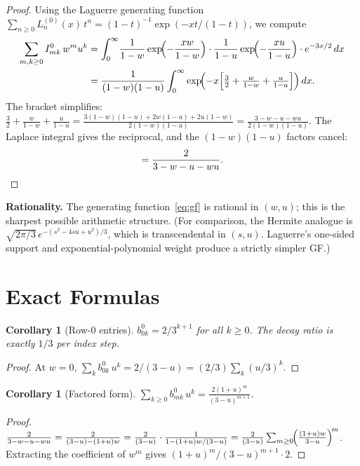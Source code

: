 \documentclass[11pt,a4paper]{article}
\theoremstyle{definition}
\theoremstyle{plain}
\newtheorem{corollary}[definition]{Corollary}
\begin{document}
\begin{proof}
Using the Laguerre generating function
$\sum_{n\ge 0}L_n^{(0)}(x)\,t^n = (1-t)^{-1}\exp(-xt/(1-t))$,
we compute
\begin{align*}
  \sum_{m,k\ge 0} I_{mk}^0\,w^m u^k
  &= \int_0^\infty\!
     \frac{1}{1-w}\exp\!\Bigl(-\frac{xw}{1-w}\Bigr)\cdot
     \frac{1}{1-u}\exp\!\Bigl(-\frac{xu}{1-u}\Bigr)\cdot
     e^{-3x/2}\,dx \\
  &= \frac{1}{(1-w)(1-u)}\int_0^\infty \exp\!\Bigl(
     -x\Bigl[\tfrac{3}{2}+\tfrac{w}{1-w}+\tfrac{u}{1-u}\Bigr]\Bigr)\,dx.
\end{align*}
The bracket simplifies: $\frac{3}{2}+\frac{w}{1-w}+\frac{u}{1-u}
= \frac{3(1-w)(1-u)+2w(1-u)+2u(1-w)}{2(1-w)(1-u)}
= \frac{3-w-u-wu}{2(1-w)(1-u)}$.
The Laplace integral gives the reciprocal, and the $(1-w)(1-u)$ factors cancel:
\[
  = \frac{2}{3-w-u-wu}.\qedhere
\]
\end{proof}

\noindent\textbf{Rationality.} The generating function~\eqref{eq:gf} is
rational in $(w,u)$; this is the sharpest possible arithmetic structure.
(For comparison, the Hermite analogue is $\sqrt{2\pi/3}\,e^{-(s^2-4su+u^2)/3}$,
which is transcendental in $(s,u)$. Laguerre's one-sided support and
exponential-polynomial weight produce a strictly simpler GF.)

\section{Exact Formulas}

\begin{corollary}[Row-0 entries]\label{cor:row0}
$b_{0k}^0 = 2/3^{k+1}$ for all $k\ge 0$.
The decay ratio is exactly $1/3$ per index step.
\end{corollary}

\begin{proof}
At $w=0$, $\sum_k b_{0k}^0\,u^k = 2/(3-u) = (2/3)\sum_k(u/3)^k$.
\end{proof}

\begin{corollary}[Factored form]\label{cor:factor}
$\displaystyle\sum_{k\ge 0}b_{mk}^0\,u^k
= \frac{2(1+u)^m}{(3-u)^{m+1}}$.
\end{corollary}

\begin{proof}
$\frac{2}{3-w-u-wu} = \frac{2}{(3-u)-(1+u)w}
= \frac{2}{(3-u)}\cdot\frac{1}{1-(1+u)w/(3-u)}
= \frac{2}{(3-u)}\sum_{m\ge 0}\!\Bigl(\frac{(1+u)w}{3-u}\Bigr)^{\!m}$.
Extracting the coefficient of $w^m$ gives $(1+u)^m/(3-u)^{m+1}\cdot 2$.
\end{proof}
\end{document}
